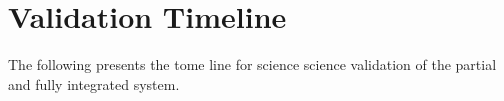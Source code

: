 \section{Validation Timeline} \label{sec:timeline}

The following presents the tome line for science science validation of the partial and fully integrated system. 